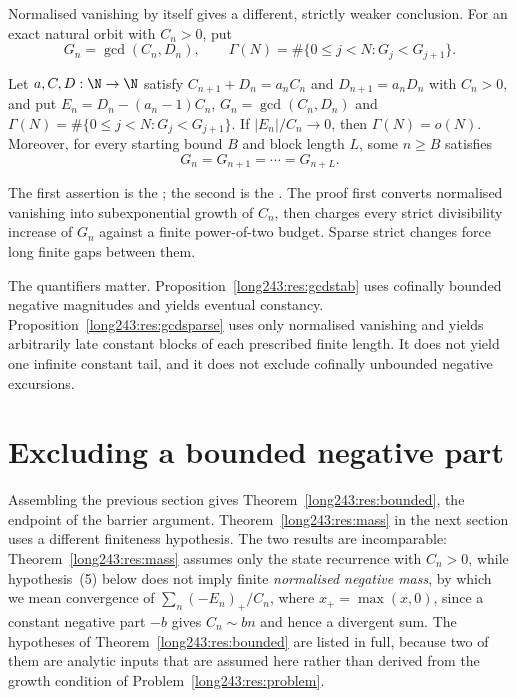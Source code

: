 Normalised vanishing by itself gives a different, strictly weaker conclusion.
For an exact natural orbit with $C_n>0$, put
\[
 G_n=\gcd(C_n,D_n),\qquad
 \Gamma(N)=\#\{0\le j<N:G_j<G_{j+1}\}.
\]

\begin{proposition}
\label{long243:res:gcdsparse}
Let $a,C,D:\N\to\N$ satisfy $C_{n+1}+D_n=a_nC_n$ and $D_{n+1}=a_nD_n$ with
$C_n>0$, and put $E_n=D_n-(a_n-1)C_n$, $G_n=\gcd(C_n,D_n)$ and
$\Gamma(N)=\#\{0\le j<N:G_j<G_{j+1}\}$.  If $|E_n|/C_n\to0$, then
$\Gamma(N)=o(N)$.  Moreover, for every starting bound $B$ and block length
$L$, some $n\ge B$ satisfies
\[
  G_n=G_{n+1}=\cdots=G_{n+L}.
\]
\end{proposition}

\noindent The first assertion is the
; the second is the
.  The proof first converts normalised vanishing
into subexponential growth of $C_n$, then charges every strict divisibility
increase of $G_n$ against a finite power-of-two budget.  Sparse strict changes
force long finite gaps between them.

The quantifiers matter.  Proposition~\ref{long243:res:gcdstab} uses cofinally bounded
negative magnitudes and yields eventual constancy.  Proposition~\ref{long243:res:gcdsparse}
uses only normalised vanishing and yields arbitrarily late constant blocks of
each prescribed finite length.  It does not yield one infinite constant tail,
and it does not exclude cofinally unbounded negative excursions.

\section{Excluding a bounded negative part}\label{long243:sec:bounded}

Assembling the previous section gives Theorem~\ref{long243:res:bounded}, the endpoint
of the barrier argument.  Theorem~\ref{long243:res:mass} in the next section uses a
different finiteness hypothesis.  The two results are incomparable:
Theorem~\ref{long243:res:mass} assumes only the state recurrence with $C_n>0$, while
hypothesis~(5) below does not imply
finite \emph{normalised negative mass}, by which we mean convergence of
$\sum_n(-E_n)_+/C_n$, where $x_+=\max(x,0)$, since a constant negative part
$-b$ gives $C_n\sim bn$ and hence a divergent sum.  The hypotheses of
Theorem~\ref{long243:res:bounded} are listed
in full, because two of them are analytic inputs
that are assumed here rather than derived from the growth condition of
Problem~\ref{long243:res:problem}.

